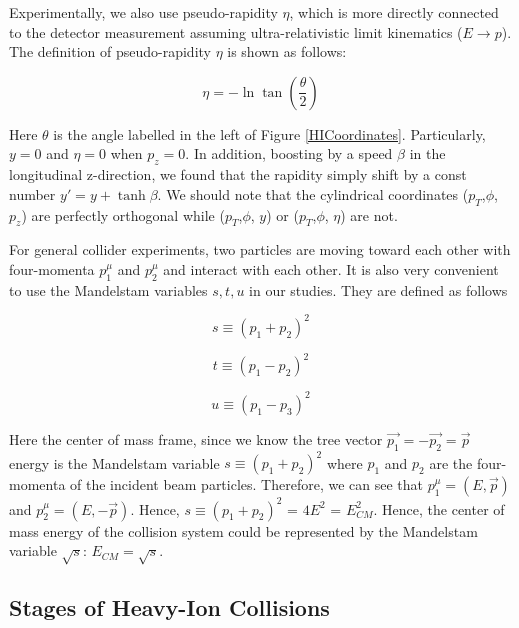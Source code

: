 Experimentally, we also use pseudo-rapidity $\eta$, which is more directly connected to the detector measurement assuming ultra-relativistic limit kinematics ($E \rightarrow p$). The definition of pseudo-rapidity $\eta$ is shown as follows:

\begin{equation}
\eta =  - \ln \tan(\frac{\theta}{2})
\end{equation}

Here $\theta$ is the angle labelled in the left of Figure \ref{HICoordinates}. Particularly, $y = 0$ and $\eta = 0$ when $p_z = 0$. In addition, boosting by a speed $\beta$ in the longitudinal z-direction, we found that the rapidity simply shift by a const number $y' = y + \tanh \beta$. We should note that the cylindrical coordinates ($p_T$,$\phi$, $p_z$) are perfectly orthogonal while ($p_T$,$\phi$, $y$) or ($p_T$,$\phi$, $\eta$) are not.

For general collider experiments, two particles are moving toward each other with four-momenta $p_1^\mu$ and $p_2^\mu$ and interact with each other. It is also very convenient to use the Mandelstam variables $s, t, u$ in our studies. They are defined as follows

\begin{equation}
s \equiv (p_1 + p_2)^2
\end{equation}

\begin{equation}
t \equiv (p_1 - p_2)^2
\end{equation}

\begin{equation}
u \equiv (p_1 - p_3)^2
\end{equation}


Here the center of mass frame, since we know the tree vector $\vec{p_1} = -\vec{p_2} = \vec{p}$ energy is the Mandelstam variable $s \equiv (p_1 + p_2)^2$ where $p_1$ and $p_2$ are the four-momenta of the incident beam particles. Therefore, we can see that $p_1^\mu = (E, \vec{p})$ and $p_2^\mu = (E, -\vec{p})$. Hence, $s \equiv (p_1 + p_2)^2$ = $4E^2$ = $E_{CM}^2$. Hence, the center of mass energy of the collision system could be represented by the Mandelstam variable $\sqrt{s}$: $E_{CM} = \sqrt{s}$.



\subsection{Stages of Heavy-Ion Collisions}


